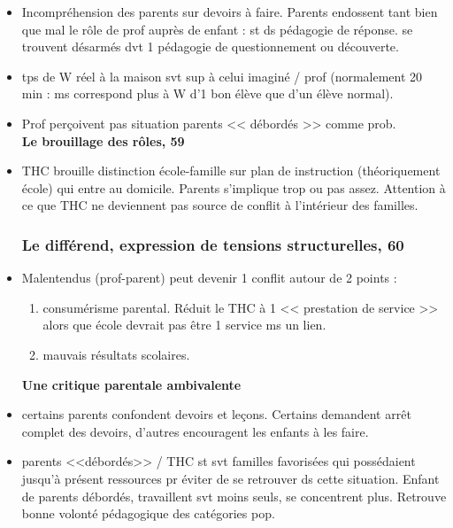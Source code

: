 \documentclass[12pt]{article}
\begin{document}
\begin{itemize}[label=]
\item Incompréhension des parents sur devoirs à faire. Parents endossent tant bien que mal le rôle de prof auprès de enfant : st ds pédagogie de réponse. se trouvent désarmés dvt 1 pédagogie de questionnement ou découverte.\\

\item tps de W réel à la maison svt sup à celui imaginé / prof (normalement 20 min : ms correspond plus à W d'1 bon élève que d'un élève normal).\\

\item Prof perçoivent pas situation parents << débordés >> comme prob. \\

\textbf{Le brouillage des rôles, 59} \\

\item THC brouille distinction école-famille sur plan de instruction (théoriquement école) qui entre au domicile. Parents s'implique trop ou pas assez. Attention à ce que THC ne deviennent pas source de conflit à l'intérieur des familles.\\

\subsubsection{Le différend, expression de tensions structurelles, 60}

\item Malentendus (prof-parent) peut devenir 1 conflit autour de 2 points : 
\begin{enumerate}
\item consumérisme parental. Réduit le THC à 1 << prestation de service >> alors que école devrait pas être 1 service ms un lien.\\
\item mauvais résultats scolaires.\\
\end{enumerate}

\textbf{Une critique parentale ambivalente}\\

\item certains parents confondent devoirs et leçons. Certains demandent arrêt complet des devoirs, d'autres encouragent les enfants à les faire.

\item parents <<débordés>> / THC st svt familles favorisées qui possédaient jusqu'à présent ressources pr éviter de se retrouver ds cette situation. Enfant de parents débordés, travaillent svt moins seuls, se concentrent plus. Retrouve bonne volonté pédagogique des catégories pop.\\


\end{itemize}
\end{document}
